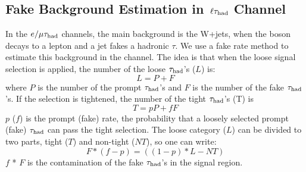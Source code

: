 \subsection{\texorpdfstring{Fake Background Estimation in $\,\ell\tau_{\rm had}$ Channel}{Fake Background Estimation in lepton-tau Channel}}
\label{sect:bkgLeptau}
In the $e/\mu\tau_{\rm had}$ channels, the main background is the W+jets, when the \Wpm boson decays to a lepton and a jet fakes a hadronic $\tau$.
We use a fake rate method to estimate this background \cite{CMS_AN_2010-261} in the \muTau channel.
The idea is that when the loose signal selection is applied, the number of the loose $\tau_{\rm had}$'s ($L$) is:
\begin{equation}
L = P + F
\end{equation}
where $P$ is the number of the  prompt $\tau_{\rm had}$'s and $F$ is the number of the  fake $\tau_{\rm had}$'s. If the selection is tightened, the number of the tight $\tau_{\rm had}$'s (T) is
\begin{equation}
 T = pP + fF
\end{equation} 
$p$ ($f$) is the prompt (fake) rate, the probability that a loosely selected prompt (fake) $\tau_{\rm had}$ can pass the  tight  selection. The loose category ($L$) can be divided to two parts, 
tight ($T$) and non-tight ($NT$), so one can write:
\begin{equation}
   F * (f - p) = ((1 - p) * L - NT)
\end{equation}
$f$ * $F$ is the contamination of the fake $\tau_{\rm had}$'s in the signal region. 

